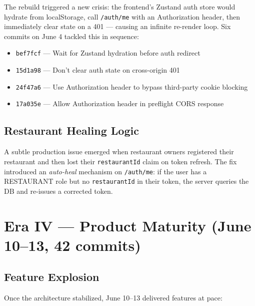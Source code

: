 \documentclass[11pt,a4paper,twoside]{book}
\begin{document}
The rebuild triggered a new crisis: the frontend's Zustand auth store would
hydrate from localStorage, call \texttt{/auth/me} with an Authorization header,
then immediately clear state on a 401 — causing an infinite re-render loop.
Six commits on June 4 tackled this in sequence:

\begin{tcolorbox}[commit,title=Auth loop resolution (June 4--5)]
\begin{itemize}[leftmargin=1em,nosep,topsep=2pt]
  \item \texttt{bef7fcf} — Wait for Zustand hydration before auth redirect
  \item \texttt{15d1a98} — Don't clear auth state on cross-origin 401
  \item \texttt{24f47a6} — Use Authorization header to bypass third-party cookie blocking
  \item \texttt{17a035e} — Allow Authorization header in preflight CORS response
\end{itemize}
\end{tcolorbox}

\subsection{Restaurant Healing Logic}

A subtle production issue emerged when restaurant owners registered their
restaurant and then lost their \texttt{restaurantId} claim on token refresh.
The fix introduced an \emph{auto-heal} mechanism on \texttt{/auth/me}: if the
user has a RESTAURANT role but no \texttt{restaurantId} in their token, the
server queries the DB and re-issues a corrected token.

\section{Era IV — Product Maturity (June 10–13, 42 commits)}

\subsection{Feature Explosion}

Once the architecture stabilized, June 10–13 delivered features at pace:
\end{document}
